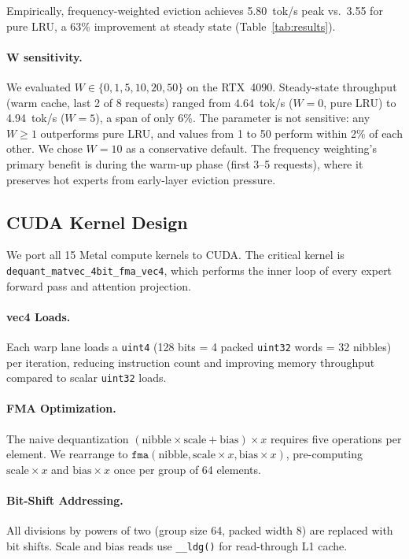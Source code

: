 \documentclass[11pt]{article}
\begin{document}
Empirically, frequency-weighted eviction achieves 5.80~tok/s peak vs.\ 3.55 for pure LRU, a 63\% improvement at steady state (Table~\ref{tab:results}).

\paragraph{W sensitivity.} We evaluated $W \in \{0, 1, 5, 10, 20, 50\}$ on the RTX~4090. Steady-state throughput (warm cache, last 2 of 8 requests) ranged from 4.64~tok/s ($W=0$, pure LRU) to 4.94~tok/s ($W=5$), a span of only 6\%. The parameter is not sensitive: any $W \geq 1$ outperforms pure LRU, and values from 1 to 50 perform within 2\% of each other. We chose $W=10$ as a conservative default. The frequency weighting's primary benefit is during the warm-up phase (first 3--5 requests), where it preserves hot experts from early-layer eviction pressure.

\subsection{CUDA Kernel Design}

We port all 15 Metal compute kernels to CUDA. The critical kernel is \texttt{dequant\_matvec\_4bit\_fma\_vec4}, which performs the inner loop of every expert forward pass and attention projection.

\paragraph{vec4 Loads.} Each warp lane loads a \texttt{uint4} (128 bits = 4 packed \texttt{uint32} words = 32 nibbles) per iteration, reducing instruction count and improving memory throughput compared to scalar \texttt{uint32} loads.

\paragraph{FMA Optimization.} The naive dequantization $(\text{nibble} \times \text{scale} + \text{bias}) \times x$ requires five operations per element. We rearrange to $\texttt{fma}(\text{nibble}, \text{scale} \times x, \text{bias} \times x)$, pre-computing $\text{scale} \times x$ and $\text{bias} \times x$ once per group of 64 elements.

\paragraph{Bit-Shift Addressing.} All divisions by powers of two (group size 64, packed width 8) are replaced with bit shifts. Scale and bias reads use \texttt{\_\_ldg()} for read-through L1 cache.
\end{document}
